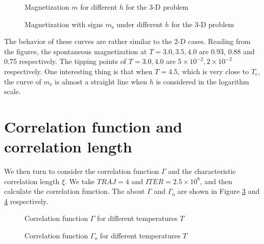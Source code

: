 \documentclass[english, nochinese]{pnote}
\begin{document}
\begin{figure}[htbp]
\centering

\caption{Magnetization $m$ for different $h$ for the 3-D problem}
\label{Fig:MagAbs3D}
\end{figure}

\begin{figure}[htbp]
\centering

\caption{Magnetization with signs $m_{\text{s}}$ under different $h$ for the 3-D problem}
\label{Fig:Mag3D}
\end{figure}

The behavior of these curves are rather similar to the 2-D cases. Reading from the figures, the spontaneous magnetization at $ T = 3.0, 3.5, 4.0 $ are 0.93, 0.88 and 0.75 respectively. The tipping points of $ T = 3.0, 4.0 $ are $ 5 \times 10^{-2}, 2 \times 10^{-2} $ respectively. One interesting thing is that when $ T = 4.5 $, which is very close to $T_{\text{c}}$, the curve of $m_{\text{s}}$ is almost a straight line when $h$ is considered in the logarithm scale.

\section{Correlation function and correlation length}

We then turn to consider the correlation function $\Gamma$ and the characteristic correlation length $\xi$. We take $ \mathit{TRAJ} = 4 $ and $ \mathit{ITER} = 2.5 \times 10^8 $, and then calculate the correlation function. The about $\Gamma$ and $\Gamma_{\text{o}}$ are shown in Figure \ref{Fig:Gamma} and \ref{Fig:GammaO} respectively.

\begin{figure}[htbp]
\centering

\caption{Correlation function $\Gamma$ for different temperatures $T$}
\label{Fig:Gamma}
\end{figure}

\begin{figure}[htbp]
\centering

\caption{Correlation function $\Gamma_{\text{o}}$ for different temperatures $T$}
\label{Fig:GammaO}
\end{figure}
\end{document}
